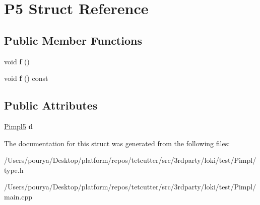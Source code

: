 \hypertarget{structP5}{}\section{P5 Struct Reference}
\label{structP5}
\subsection*{Public Member Functions}
\begin{DoxyCompactItemize}
\item 
\hypertarget{structP5_a7c032dd6b7a30129d9b4628cb6246953}{}void {\bfseries f} ()\label{structP5_a7c032dd6b7a30129d9b4628cb6246953}

\item 
\hypertarget{structP5_a727a304ee2f016265a548b04050c7a95}{}void {\bfseries f} () const \label{structP5_a727a304ee2f016265a548b04050c7a95}

\end{DoxyCompactItemize}
\subsection*{Public Attributes}
\begin{DoxyCompactItemize}
\item 
\hypertarget{structP5_ab917ba7dc3e3caaf48973e0160ede71e}{}\hyperlink{classLoki_1_1Pimpl}{Pimpl5} {\bfseries d}\label{structP5_ab917ba7dc3e3caaf48973e0160ede71e}

\end{DoxyCompactItemize}


The documentation for this struct was generated from the following files\+:\begin{DoxyCompactItemize}
\item 
/\+Users/pourya/\+Desktop/platform/repos/tetcutter/src/3rdparty/loki/test/\+Pimpl/type.\+h\item 
/\+Users/pourya/\+Desktop/platform/repos/tetcutter/src/3rdparty/loki/test/\+Pimpl/main.\+cpp\end{DoxyCompactItemize}
